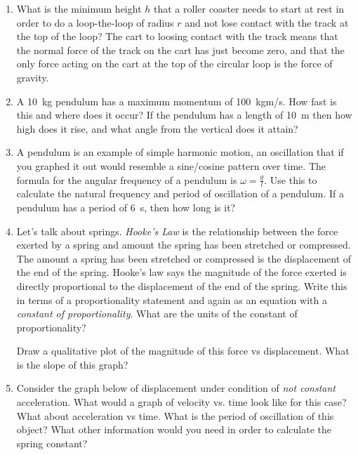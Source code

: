 \begin{enumerate}
\item What is the minimum height $h$ that a roller coaster needs to start at rest in order to do a loop-the-loop of radius $r$ and not lose contact with the track at the top of the loop? The cart to loosing contact with the track means that the normal force of the track on the cart has just become zero, and that the only force acting on the cart at the top of the circular loop is the force of gravity. \hugeskip

\item A \SI{10}{kg} pendulum has a maximum momentum of \SI{100}{kgm/s}. How fast is this and where does it occur? If the pendulum has a length of \SI{10}{m} then how high does it rise, and what angle from the vertical does it attain?
\bigskip

\item A pendulum is an example of simple harmonic motion, an oscillation that if you graphed it out would resemble a sine/cosine pattern over time. The formula for the angular frequency of a pendulum is $\omega = \frac{g}{l}$. Use this to calculate the natural frequency and period of oscillation of a pendulum. If a pendulum has a period of \SI{6}{s}, then how long is it? 
\bigskip

\item Let's talk about springs. \emph{Hooke's Law} is the relationship between the force exerted by a spring and amount the spring has been stretched or compressed. The amount a spring has been stretched or compressed is the displacement of the end of the spring. Hooke's law says the magnitude of the force exerted is directly proportional to the displacement of the end of the spring. Write this in terms of a proportionality statement and again as an equation with a \emph{constant of proportionality}. What are the units of the constant of proportionality?\bigskip

Draw a qualitative plot of the magnitude of this force vs displacement. What is the slope of this graph?\hugeskip

\item Consider the graph below of displacement under condition of \emph{not constant} acceleration. What would a graph of velocity vs. time look like for this case? What about acceleration vs time. What is the period of oscillation of this object? What other information would you need in order to calculate the spring constant?




\end{enumerate}
